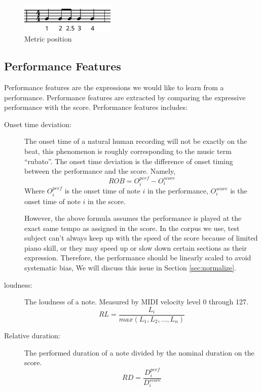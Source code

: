 \begin{description}
   \begin{figure}[tp]
      \begin{center}
         \includegraphics[width=0.4\textwidth]{fig/metrical}
      \end{center}
      \caption{Metric position}
      \label{fig:metrical}
   \end{figure}
      \end{description}




\subsection{Performance Features}
   Performance features are the expressions we would like to learn from a performance. Performance features are extracted by comparing the expressive performance with the score.
      Performance features includes:
      \begin{description}
         \item [Onset time deviation:] 
            The onset time of a natural human recording will not be exactly on the beat, this phenomenon is roughly corresponding to the music term \enquote{rubato}. The onset time deviation is the difference of onset timing between the performance and the score. Namely,
            $$ ROB = O_i^{perf} - O_i^{score} $$ Where $O_i^{perf}$ is the onset time of note $i$ in the performance, $O_i^{score}$ is the onset time of note $i$ in the score.  

            However, the above formula assumes the performance is played at the exact same tempo as assigned in the score. In the corpus we use, test subject can't always keep up with the speed of the score because of limited piano skill, or they may speed up or slow down certain sections as their expression. Therefore, the performance should be linearly scaled to avoid systematic bias, We will discuss this issue in Section \ref{sec:normalize}.
         \item [loudness:] The loudness of a note.  Measured by MIDI velocity level 0 through 127.
            $$ RL = \frac{L_i}{max(L_1, L_2, \dots, L_n)}$$

         \item [Relative duration:]
            The performed duration of a note divided by the nominal duration on the score.
            $$ RD = \frac{ D_i^{perf}}{D_i^{score}}$$
      \end{description}

